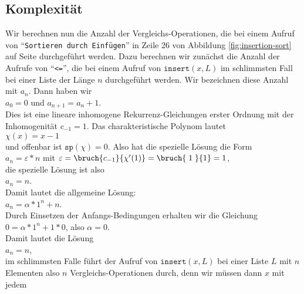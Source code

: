 \subsection{Komplexit\"at}
Wir berechnen nun die Anzahl der Vergleichs-Operationen, die bei einem Aufruf von
``\texttt{Sortieren durch Einf\"ugen}'' in Zeile 26 von Abbildung
\ref{fig:insertion-sort} auf Seite \pageref{fig:insertion-sort} durchgef\"uhrt werden. Dazu
berechnen wir zun\"achst die Anzahl der Aufrufe von ``\texttt{<=}'', die bei einem Aufruf
von $\texttt{insert}(x,L)$ im schlimmsten Fall bei einer Liste der L\"ange $n$
durchgef\"uhrt werden.  Wir bezeichnen diese Anzahl mit $a_n$. Dann haben wir \\[0.1cm]
\hspace*{1.3cm} $a_0 = 0$ \quad und \quad $a_{n+1} = a_n + 1$. \\[0.1cm]
Dies ist eine lineare inhomogene Rekurrenz-Gleichungen erster Ordnung mit der Inhomogenit\"at $c_{-1} = 1$.  Das charakteristische
Polynom lautet \\[0.1cm]
\hspace*{1.3cm} $\chi(x) = x - 1$ \\[0.1cm]
und offenbar ist $\mathtt{sp}(\chi) = 0$.  Also hat die spezielle L\"osung die Form
 \\[0.1cm]
\hspace*{1.3cm}
$a_n = \varepsilon * n$ \quad mit $\varepsilon = \bruch{c_{-1}}{\chi'(1)} = \bruch{\;1\;}{1} = 1$,
\\[0.1cm]
 die spezielle L\"osung ist also \\[0.1cm]
\hspace*{1.3cm} $a_n = n$.
\\[0.1cm]
Damit lautet die allgemeine L\"osung: \\[0.1cm]
\hspace*{1.3cm} $a_n = \alpha * 1^n + n$. \\[0.1cm]
Durch Einsetzen der Anfangs-Bedingungen erhalten wir die Gleichung \\[0.1cm]
\hspace*{1.3cm} $0 = \alpha * 1^n + 1 * 0$, \quad also $\alpha = 0$. \\[0.1cm]
Damit lautet die L\"osung \\[0.1cm]
\hspace*{1.3cm} $a_n = n$, \\[0.1cm]
im schlimmsten Falle f\"uhrt der Aufruf von $\mathtt{insert}(x,L)$ bei einer Liste $L$ mit
$n$ Elementen also $n$ Vergleichs-Operationen durch, denn wir m\"ussen dann $x$ mit jedem
